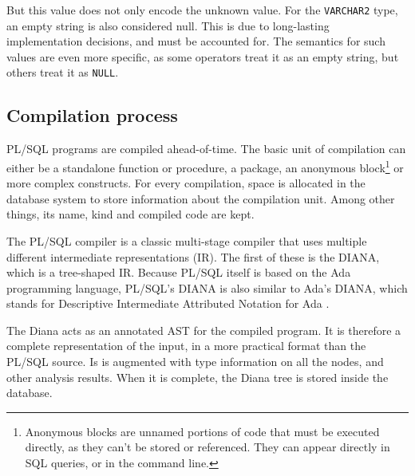 \documentclass[twoside,11pt,a4paper]{article}
\newcommand{\pls}[1]{\texttt{#1}}
\newcommand{\plstype}[1]{\pls{#1}}
\newcommand{\varchar}{\plstype{VARCHAR2}}
\newcommand{\plsnull}{\pls{NULL}}
\begin{document}
But this value does not only encode the unknown value. For the \varchar{} type, an empty string is also considered null. This is due to long-lasting implementation decisions, and must be accounted for. The semantics for such values are even more specific, as some operators treat it as an empty string, but others treat it as \plsnull{}.

\subsection{Compilation process}
\label{sec:plscompilation}


PL/SQL programs are compiled ahead-of-time. The basic unit of compilation can either be a standalone function or procedure, a package, an anonymous block\footnote{Anonymous blocks are unnamed portions of code that must be executed directly, as they can't be stored or referenced. They can appear directly in SQL queries, or in the command line.} or more complex constructs. For every compilation, space is allocated in the database system to store information about the compilation unit. Among other things, its name, kind and compiled code are kept.

The PL/SQL compiler is a classic multi-stage compiler that uses multiple different intermediate representations (IR). The first of these is the DIANA, which is a tree-shaped IR. Because PL/SQL itself is based on the Ada programming language, PL/SQL's DIANA is also similar to Ada's DIANA, which stands for Descriptive Intermediate Attributed Notation for Ada \cite{dianabook}.

The Diana acts as an annotated AST for the compiled program. It is therefore a complete representation of the input, in a more practical format than the PL/SQL source. Is is augmented with type information on all the nodes, and other analysis results. When it is complete, the Diana tree is stored inside the database.


\end{document}
